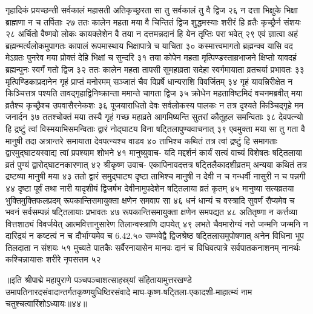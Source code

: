 गृहादिकं प्रयच्छन्ती सर्वकालं महासती 
अतिकृच्छ्ररता सा तु सर्वकालं तु वै द्विज २६
न दत्ता भिक्षुके भिक्षा ब्राह्मणा न च तर्पिताः २७
ततः कालेन महता मया वै चिन्तितं द्विज 
शुद्धमस्याः शरीरं हि व्रतैः कृच्छ्रैर्न संशयः २८
अर्चितो वैष्णवो लोकः कायक्लेशेन  वै तया 
न दत्तमन्नदानं हि येन तृप्तिः परा भवेत् २९
एवं ज्ञात्वा अहं ब्रह्मन्मर्त्यलोकमुपागतः 
कापालं रूपमास्थाय भिक्षापात्रे च याचिता ३०
कस्मात्त्वमागतो ब्रह्मन्क्व यासि वद मेऽग्रतः 
पुनरेव मया प्रोक्तं देहि भिक्षां च सुन्दरि ३१
तया कोपेन महता मृत्पिण्डस्ताम्रभाजने 
क्षिप्तो यावदहं ब्रह्मन्पुनः स्वर्गं गतो द्विज ३२
ततः कालेन महता तापसी सुमहाव्रता 
सदेहा स्वर्गमायाता व्रतचर्या प्रभावतः ३३
मृत्पिण्डिकाप्रदानेन गृहं प्राप्तं मनोरमम् 
सञ्जातं चैव विप्रर्षे धान्यराशि विवर्जितम् ३४
गृहं यावन्निरीक्षेत न किञ्चित्तत्र पश्यति 
तावद्गृहाद्विनिष्क्रान्ता ममान्ते चागता द्विज ३५
क्रोधेन महताविष्टमिदं वचनमब्रवीत् 
मया व्रतैश्च कृच्छ्रैश्च उपवासैरनेकशः ३६
पूजयाराधितो देवः सर्वलोकस्य पालकः 
न तत्र  दृश्यते किञ्चिद्गृहे मम जनार्दन ३७
ततश्चोक्तं मया तस्यै गृहं गच्छ महाव्रते 
आगमिष्यन्ति सुतरां कौतूहल समन्विताः ३८
देवपत्न्यो हि द्रष्टुं त्वां विस्मयाभिसमन्विताः 
द्वारं नोद्घाटय विना षट्तिलापुण्यवाचनात् ३९
एवमुक्ता मया सा तु गता वै मानुषी तदा 
अत्रान्तरे समायाता देवपत्न्यश्च वाडव ४०
ताभिश्च कथितं तत्र त्वां द्रष्टुं हि समागताः 
द्वारमुद्घाटयस्वाद्य त्वां प्रपश्याम शोभने ४१
मानुष्युवाच-
यदि मद्दर्शनं कार्यं सत्यं वाच्यं विशेषतः 
षट्तिलाया व्रतं पुण्यं द्वारोद्घाटनकारणात् ४२
श्रीकृष्ण उवाच-
एकापिनावदत्तत्र षट्तिलैकादशीव्रतम् 
अन्यया कथितं तत्र द्रष्टव्या मानुषी मया ४३
ततो द्वारं समुद्घाट्य दृष्टा ताभिश्च मानुषी 
न देवी न च गन्धर्वी नासुरी न च पन्नगी ४४
दृष्टा पूर्वं तथा नारी यादृशीयं द्विजर्षभ 
देवीनामुपदेशेन षट्तिलाया व्रतं कृतम् ४५
मानुष्या सत्यव्रतया भुक्तिमुक्तिफलप्रदम् 
रूपकान्तिसमायुक्ता क्षणेन समवाप सा ४६
धनं धान्यं च वस्त्रादि सुवर्णं रौप्यमेव च 
भवनं सर्वसम्पन्नं षट्तिलायाः प्रभावतः ४७
रूपकान्तिसमायुक्ता क्षणेन समपद्यत ४८
अतितृष्णा न कर्त्तव्या वित्तशाठ्यं विवर्जयेत् 
आत्मवित्तानुसारेण तिलान्वस्त्राणि दापयेत् ४९
लभते चैवमारोग्यं नरो जन्मनि जन्मनि 
न दारिद्र्यं न कष्टत्वं न च दौर्भाग्यमेव च 6.42.५०
सम्भवेद्वै द्विजश्रेष्ठ षट्तिलासमुपोषणात् 
अनेन विधिना भूप तिलदाता न संशयः ५१
मुच्यते पातकैः सर्वैरनायासेन मानवः 
दानं च विधिवत्पात्रे सर्वपातकनाशनम् 
नानर्थः कश्चिन्नायासः शरीरे नृपसत्तम ५२


॥इति श्रीपाद्मे महापुराणे पञ्चपञ्चाशत्साहस्र्यां संहितायामुत्तरखण्डे उमापतिनारदसंवादान्तर्गतकृष्णयुधिष्ठिरसंवादे माघ-कृष्ण-षट्तिला-एकादशी-माहात्म्यं नाम चतुश्चत्वारिंशोऽध्यायः॥४४॥

